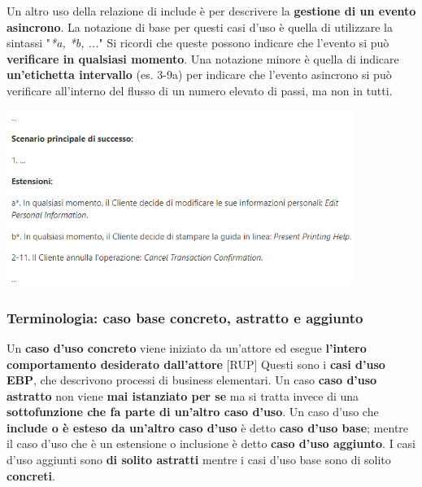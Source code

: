 \documentclass[12pt]{article}
\begin{document}
Un altro uso della relazione di include è per descrivere la \textbf{gestione di un evento asincrono}. La notazione di base per questi casi d'uso è quella di utilizzare la sintassi "\textit{*a, *b, ...}"
Si ricordi che queste possono indicare che l'evento si può \textbf{verificare in qualsiasi momento}. Una notazione minore è quella di indicare \textbf{un'etichetta intervallo} (es. 3-9a) per indicare che l'evento asincrono si può verificare all'interno del flusso di un numero elevato di passi, ma non in tutti.
\begin{center}
    \includegraphics[width = 0.85\textwidth]{Images/44.png}
\end{center}
\subsubsection{Terminologia: caso base concreto, astratto e aggiunto}
Un \textbf{caso d'uso concreto} viene iniziato da un'attore ed esegue \textbf{l'intero comportamento desiderato dall'attore} [RUP]
Questi sono i \textbf{casi d'uso EBP}, che descrivono processi di business elementari.
Un caso \textbf{caso d'uso astratto} non viene \textbf{mai istanziato per se} ma si tratta invece di una \textbf{sottofunzione che fa parte di un'altro caso d'uso}.
Un caso d'uso che \textbf{include o è esteso da un'altro caso d'uso} è detto \textbf{caso d'uso base}; mentre il caso d'uso che è un estensione o inclusione è detto \textbf{caso d'uso aggiunto}.
I casi d'uso aggiunti sono \textbf{di solito astratti} mentre i casi d'uso base sono di solito \textbf{concreti}.
\end{document}
